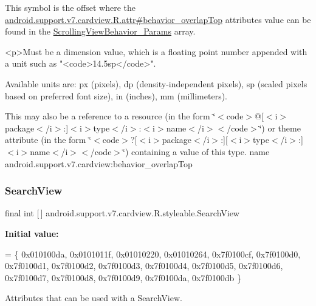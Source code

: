 This symbol is the offset where the \hyperlink{classandroid_1_1support_1_1v7_1_1cardview_1_1R_1_1attr_a3f74f7edc2044d09a9f4bf782fc271dc}{android.\+support.\+v7.\+cardview.\+R.\+attr\#behavior\+\_\+overlap\+Top} attribute\textquotesingle{}s value can be found in the \hyperlink{classandroid_1_1support_1_1v7_1_1cardview_1_1R_1_1styleable_adee7a6b56432df3dafacd56ba69c4e85}{Scrolling\+View\+Behavior\+\_\+\+Params} array.

\begin{DoxyVerb}      <p>Must be a dimension value, which is a floating point number appended with a unit such as "<code>14.5sp</code>".
\end{DoxyVerb}
 Available units are\+: px (pixels), dp (density-\/independent pixels), sp (scaled pixels based on preferred font size), in (inches), mm (millimeters). 

This may also be a reference to a resource (in the form \char`\"{}$<$code$>$@\mbox{[}$<$i$>$package$<$/i$>$\+:\mbox{]}$<$i$>$type$<$/i$>$\+:$<$i$>$name$<$/i$>$$<$/code$>$\char`\"{}) or theme attribute (in the form \char`\"{}$<$code$>$?\mbox{[}$<$i$>$package$<$/i$>$\+:\mbox{]}\mbox{[}$<$i$>$type$<$/i$>$\+:\mbox{]}$<$i$>$name$<$/i$>$$<$/code$>$\char`\"{}) containing a value of this type.  name android.\+support.\+v7.\+cardview\+:behavior\+\_\+overlap\+Top \mbox{\label{classandroid_1_1support_1_1v7_1_1cardview_1_1R_1_1styleable_a6a300ecad88f70a7642265f73ff4d33f}} 
\subsubsection{\texorpdfstring{Search\+View}{SearchView}}
{\footnotesize\ttfamily final int \mbox{[}$\,$\mbox{]} android.\+support.\+v7.\+cardview.\+R.\+styleable.\+Search\+View\hspace{0.3cm}{\ttfamily [static]}}

{\bfseries Initial value\+:}
\begin{DoxyCode}
= \{
            0x010100da, 0x0101011f, 0x01010220, 0x01010264,
            0x7f0100cf, 0x7f0100d0, 0x7f0100d1, 0x7f0100d2,
            0x7f0100d3, 0x7f0100d4, 0x7f0100d5, 0x7f0100d6,
            0x7f0100d7, 0x7f0100d8, 0x7f0100d9, 0x7f0100da,
            0x7f0100db
        \}
\end{DoxyCode}
Attributes that can be used with a Search\+View. 

